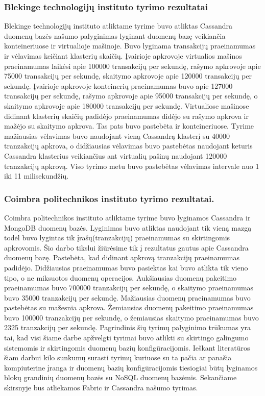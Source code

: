 \documentclass{VUMIFPSkursinis}
\begin{document}
\subsubsection{Blekinge technologijų instituto tyrimo rezultatai}
Blekinge technologijų instituto atliktame tyrime \cite{BITCass} buvo atliktas Cassandra duomenų bazės našumo palyginimas lyginant duomenų bazę veikiančia konteineriuose ir virtualioje mašinoje. Buvo lyginama transakcijų praeinamumas ir vėlavimas keičiant klasterių skaičių. Įvairioje apkrovoje virtualios mašinos praeinamumas laikėsi apie 100000 transakcijų per sekundę, rašymo apkrovoje apie 75000 transakcijų per sekundę, skaitymo apkrovoje apie 120000 transakcijų per sekundę.
Įvairioje apkrovoje konteinerių praeinamumas buvo apie 127000 transakcijų per sekundę, rašymo apkrovoje apie 95000 transakcijų per sekundę, o skaitymo apkrovoje apie 180000 transakcijų per sekundę. Virtualiose mašinose didinant klasterių skaičių padidėjo praeinamumas didėjo su rašymo apkrova ir mažėjo su skaitymo apkrova. Tas pats buvo pastebėta ir konteineriuose.
\newline
Tyrime mažiausias vėlavimas buvo naudojant vieną Cassandrą klasterį su 40000 tranzakcijų apkrova, o didžiausias vėlavimas buvo pastebėtas naudojant keturis Cassandra klasterius veikiančius ant virtualių pašinų naudojant 120000 tranzakcijų apkrovą. 
Viso tyrimo metu buvo pastebėtas vėlavimas intervale nuo 1 iki 11 milisekundžių.
\subsubsection{Coimbra politechnikos instituto tyrimo rezultatai.}
Coimbra politechnikos instituto atliktame tyrime \cite{MonCas} buvo lyginamos Cassandra ir MongoDB duomenų bazės. 
Lyginimas buvo atliktas naudojant tik vieną mazgą todėl buvo lygintas tik įrašų(tranzakcijų) praeinamumas su skirtingomis apkrovomis. 
Šio darbo tikslui žiūrėsime tik į rezultatus gautus apie Cassandra duomenų bazę. Pastebėta, kad didinant apkrovą tranzakcijų praeinamumas padidėjo. 
Didžiausias praeinamumas buvo pasiektas kai buvo atlikta tik vieno tipo, o ne miksuotos duomenų operacijos.
Aukšiausias duomenų pakeitimo praeinamumas buvo 700000 tranzakcijų per sekundę, o skaitymo praeinamumas buvo 35000 tranzakcijų per sekundę.
Mažiausias duomenų praeinamumas buvo pastebėtas su mažesnia apkrova.
Žemiausias duomenų pakeitimo praeinamumas buvo 100000 tranzakcijų per sekundę, o žemiausias skaitymo praeinamumas buvo 2325 tranzakcijų per sekundę.
\newline
Pagrindinis šių tyrimų palyginimo trūkumas yra tai, kad visi šiame darbe apžvelgti tyrimai buvo atlikti su skirtingo galingumo sistemomis ir skirtingomis duomenų bazių konfigūracijomis. 
Ieškant literatūros šiam darbui kilo sunkumų surasti tyrimų kuriuose su ta pačia ar panašia kompiuterine įranga ir duomenų bazių konfigūracijomis tiesiogiai būtų lyginamos blokų grandinių duomenų bazės su NoSQL duomenų bazėmis. Sekančiame skirsnyje bus atliekamos Fabric ir Cassandra našumo tyrimas.
\end{document}
